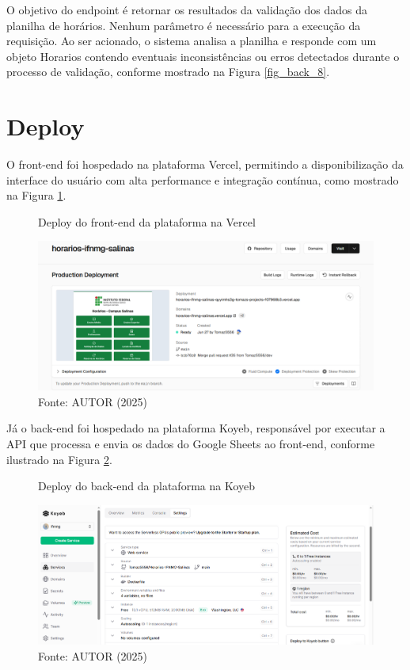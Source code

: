 \begin{itemize}
    O objetivo do endpoint é retornar os resultados da validação dos dados da planilha de horários. Nenhum parâmetro é necessário para a execução da requisição. Ao ser acionado, o sistema analisa a planilha e responde com um objeto Horarios contendo eventuais inconsistências ou erros detectados durante o processo de validação, conforme mostrado na Figura \ref{fig_back_8}.
\end{itemize}

\section{Deploy}

O front-end foi hospedado na plataforma Vercel, permitindo a disponibilização da interface do usuário com alta performance e integração contínua, como mostrado na Figura \ref{fig_deploy_1}.

\begin{figure}[H]
    \centering
    \caption{Deploy do front-end da plataforma na Vercel}
    \includegraphics[width=1\textwidth]{Figuras/deploy-1.png}
    \caption*{Fonte: AUTOR (2025)}
    \label{fig_deploy_1}
\end{figure}

Já o back-end foi hospedado na plataforma Koyeb, responsável por executar a API que processa e envia os dados do Google Sheets ao front-end, conforme ilustrado na Figura \ref{fig_deploy_2}.

\begin{figure}[htb]
    \centering
    \caption{Deploy do back-end da plataforma na Koyeb}
    \includegraphics[width=1\textwidth]{Figuras/deploy-2.png}
    \caption*{Fonte: AUTOR (2025)}
    \label{fig_deploy_2}
\end{figure}

